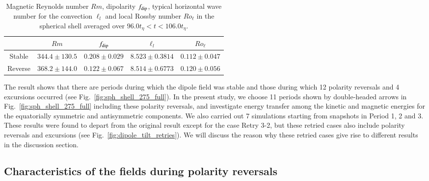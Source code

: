 \begin{table}[t]
\caption{Magnetic Reynolds number $Rm$, dipolarity $f_{\rm dip}$, 
{\color{red} typical horizontal wave number for the convection $\ell_{l}$ }
and local Rossby number $Ro_{\ell}$ in the spherical shell averaged over $96.0 t_{\eta} < t < 106.0 t_{\eta}$.}
\label{table:average_dipolarity}
\begin{tabular}{ccccc}
 & $Rm$ & $f_{\rm dip}$ & 
  ${\ell}_{l}$ & $Ro_{\ell}$ \\ \hline
\mbox{Stable} & $344.4 \pm 130.5 $ &
                $0.208 \pm 0.029$ &
                $8.523 \pm 0.3814$ & 
                $0.112 \pm 0.047$ \\
\mbox{Reverse} & $368.2 \pm 144.0 $ &
                 $0.122 \pm 0.067$ &
                 $8.514 \pm 0.6773$ & 
                 $0.120 \pm 0.056$\\ \hline
\end{tabular}
\end{table}
%

The result shows that there are periods during which the dipole field was stable and those during which 12 polarity reversals and 4 excursions occurred (see Fig.~\ref{fig:sph_shell_275_full}).
In the present study, we choose 11 %
periods shown by double-headed arrows in Fig.~\ref{fig:sph_shell_275_full} including these polarity reversals, and investigate energy transfer among the kinetic and magnetic energies for the equatorially symmetric and antisymmetric components. 
We also carried out 7 simulations starting from snapshots in Period 1, 2 and 3. 
These results were found to depart from the original result except for the case Retry 3-2, but these retried cases also include polarity reversals and excursions (see Fig.~\ref{fig:dipole_tilt_retries}). 
We will discuss the reason why these retried cases give rise to different results in the discussion section.

\subsection{Characteristics of the fields during polarity reversals}

